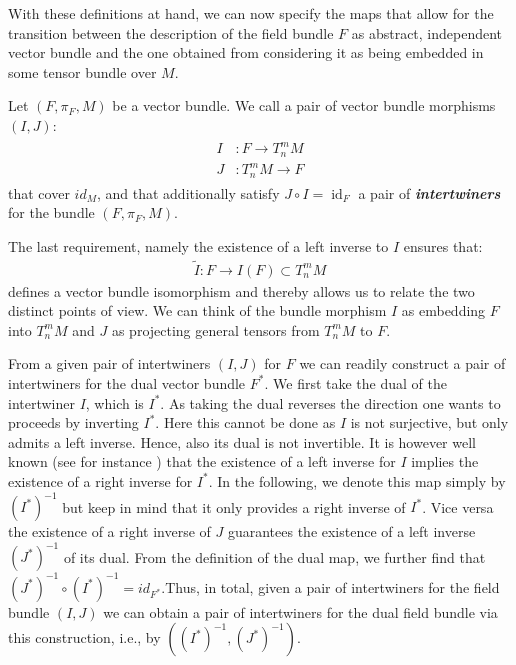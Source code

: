 With these definitions at hand, we can now specify the maps that allow for the transition between the description of the field bundle $F$ as abstract, independent vector bundle and the one obtained from considering it as being embedded in some tensor bundle over $M$.
\begin{definition}[intertwiner]\label{interDef}
Let $(F,\pi_F,M)$ be a vector bundle. We call a pair of vector bundle morphisms $(I, J)$:
\begin{align}
    \begin{aligned}
    I&: F \longrightarrow T^m_n M\\
    J&: T^m_n M \longrightarrow F 
    \end{aligned}
\end{align}
that cover $id_M$, and that additionally satisfy
$J \circ I = \operatorname{id}_F$ a pair of \textbf{\textit{intertwiners}} for the bundle $(F, \pi_F, M)$.
\end{definition}
The last requirement, namely the existence of a left inverse to $I$ ensures that: 
\begin{align}\tilde{I} : F \longrightarrow I(F) \subset T^m_nM
\end{align}
defines a vector bundle isomorphism and thereby allows us to relate the two distinct points of view.
We can think of the bundle morphism $I$ as embedding $F$ into $T^m_nM$ and $J$ as projecting general tensors from $T^m_nM$ to $F$. 

From a given pair of intertwiners $(I,J)$ for $F$ we can readily construct a pair of intertwiners for the dual vector bundle $F^{\ast}$. 
We first take the dual of the intertwiner $I$, which is $I^{\ast}$. As taking the dual reverses the direction one wants to proceeds by inverting $I^{\ast}$. Here this cannot be done as $I$ is not surjective, but only admits a left inverse. Hence, also its dual is not invertible. It is however well known (see for instance \cite{MacLane:205493}) that the existence of a left inverse for $I$ implies the existence of a right inverse for $I^{\ast}$. 
In the following, we denote this map simply by $(I^{\ast})^{-1}$ but keep in mind that it only provides a right inverse of $I^{\ast}$. Vice versa the existence of a right inverse of $J$ guarantees the existence of a left inverse $(J^{\ast})^{-1}$ of its dual. From the definition of the dual map, we further find that $(J^{\ast})^{-1} \circ (I^{\ast})^{-1} = id_{F^{\ast}}$.Thus, in total, given a pair of intertwiners for the field bundle $(I,J)$ we can obtain a pair of intertwiners for the dual field bundle via this construction, i.e., by $((I^{\ast})^{-1}, (J^{\ast})^{-1})$. 

